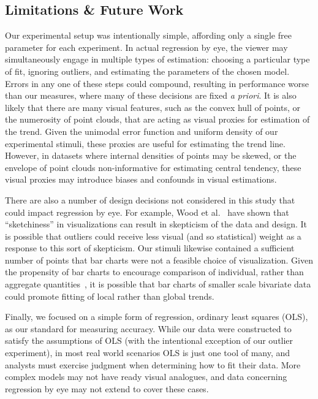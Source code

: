 \documentclass{sigchi}
\begin{document}
\subsection{Limitations \& Future Work}

Our experimental setup was intentionally simple, affording only a single free parameter for each experiment. In actual regression by eye, the viewer may simultaneously engage in multiple types of estimation: choosing a particular type of fit, ignoring outliers, and estimating the parameters of the chosen model. Errors in any one of these steps could compound, resulting in performance worse than our measures, where many of these decisions are fixed \emph{a priori}. It is also likely that there are many visual features, such as the convex hull of points, or the numerosity of point clouds, that are acting as visual proxies for estimation of the trend. Given the unimodal error function and uniform density of our experimental stimuli, these proxies are useful for estimating the trend line. However, in datasets where internal densities of points may be skewed, or the envelope of point clouds non-informative for estimating central tendency, these visual proxies may introduce biases and confounds in visual estimations.

There are also a number of design decisions not considered in this study that could impact regression by eye. For example, Wood et al.~\cite{wood2012sketchy} have shown that ``sketchiness'' in visualizations can result in skepticism of the data and design. It is possible that outliers could receive less visual (and so statistical) weight as a response to this sort of skepticism. Our stimuli likewise contained a sufficient number of points that bar charts were not a feasible choice of visualization. Given the propensity of bar charts to encourage comparison of individual, rather than aggregate quantities~\cite{zacks1999bars}, it is possible that bar charts of smaller scale bivariate data could promote fitting of local rather than global trends.

Finally, we focused on a simple form of regression, ordinary least squares (OLS), as our standard for measuring accuracy. While our data were constructed to satisfy the assumptions of OLS (with the intentional exception of our outlier experiment), in most real world scenarios OLS is just one tool of many, and analysts must exercise judgment when determining how to fit their data. More complex models may not have ready visual analogues, and data concerning regression by eye may not extend to cover these cases.
\end{document}
